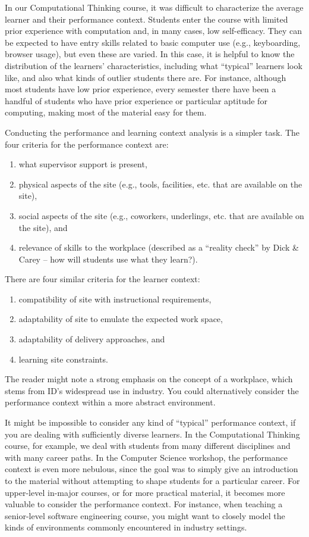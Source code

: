 In our Computational Thinking course, it was difficult to characterize the average learner and their performance context.
Students enter the course with limited prior experience with computation and, in many cases, low self-efficacy.
They can be expected to have entry skills related to basic computer use (e.g., keyboarding, browser usage), but even these are varied.
In this case, it is helpful to know the distribution of the learners' characteristics, including what ``typical'' learners look like, and also what kinds of outlier students there are.
For instance, although most students have low prior experience, every semester there have been a handful of students who have prior experience or particular aptitude for computing, making most of the material easy for them.

Conducting the performance and learning context analysis is a simpler task.
The four criteria for the performance context are:
\begin{enumerate}
\item what supervisor support is present,
\item physical aspects of the site (e.g., tools, facilities, etc. that are available on the site),
\item social aspects of the site (e.g., coworkers, underlings, etc. that are available on the site),  and
\item relevance of skills to the workplace (described as a ``reality check'' by Dick \& Carey -- how will students use what they learn?).
\end{enumerate}
There are four similar criteria for the learner context:
\begin{enumerate}
\item compatibility of site with instructional requirements,
\item adaptability of site to emulate the expected work space,
\item adaptability of delivery approaches, and
\item learning site constraints.
\end{enumerate}
The reader might note a strong emphasis on the concept of a workplace, which stems from ID's widespread use in industry.
You could alternatively consider the performance context within a more abstract environment.

It might be impossible to consider any kind of ``typical'' performance context, if you are dealing with sufficiently diverse learners.
In the Computational Thinking course, for example, we deal with students from many different disciplines and with many career paths.
In the Computer Science workshop, the performance context is even more nebulous, since the goal was to simply give an introduction to the material without attempting to shape students for a particular career.
For upper-level in-major courses, or for more practical material, it becomes more valuable to consider the performance context.
For instance, when teaching a senior-level software engineering course, you might want to closely model the kinds of environments commonly encountered in industry settings.

